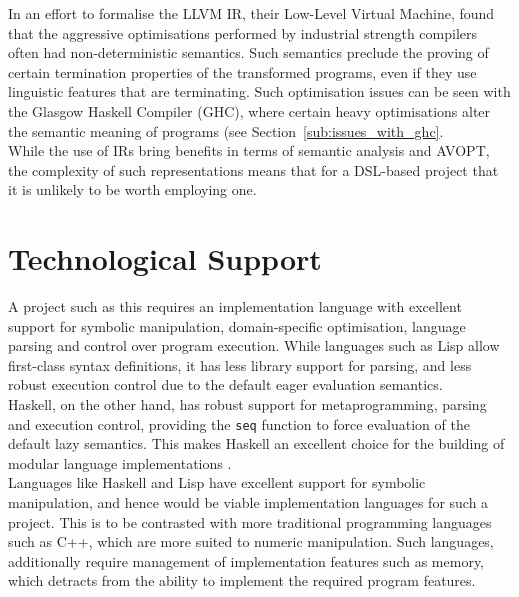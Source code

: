 In an effort to formalise the LLVM IR, their Low-Level Virtual Machine, \citet{Zhao:2012:FLI:2103621.2103709} found that the aggressive optimisations performed by industrial strength compilers often had non-deterministic semantics.
Such semantics preclude the proving of certain termination properties of the transformed programs, even if they use linguistic features that are terminating.
Such optimisation issues can be seen with the Glasgow Haskell Compiler (GHC), where certain heavy optimisations alter the semantic meaning of programs (see Section~\ref{sub:issues_with_ghc}.\\

While the use of IRs bring benefits in terms of semantic analysis and AVOPT, the complexity of such representations means that for a DSL-based project that it is unlikely to be worth employing one.



\section{Technological Support} %
\label{sec:technological_support}
A project such as this requires an implementation language with excellent support for symbolic manipulation, domain-specific optimisation, language parsing and control over program execution.
While languages such as Lisp allow first-class syntax definitions, it has less library support for parsing, and less robust execution control due to the default eager evaluation semantics. \\

Haskell, on the other hand, has robust support for metaprogramming, parsing and execution control, providing the \lstinline{seq} function to force evaluation of the default lazy semantics. 
This makes Haskell an excellent choice for the building of modular language implementations \citep{hudak1996building}.\\

Languages like Haskell and Lisp have excellent support for symbolic manipulation, and hence would be viable implementation languages for such a project. 
This is to be contrasted with more traditional programming languages such as C++, which are more suited to numeric manipulation.
Such languages, additionally require management of implementation features such as memory, which detracts from the ability to implement the required program features.\\

